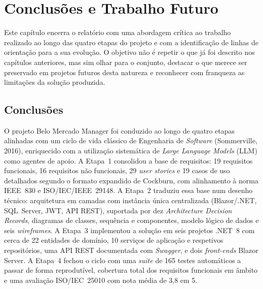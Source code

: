 \chapter{Conclusões e Trabalho Futuro}

    Este capítulo encerra o relatório com uma abordagem crítica ao trabalho realizado ao longo das quatro etapas do projeto e com a identificação de linhas de orientação para a sua evolução. O objetivo não é repetir o que já foi descrito nos capítulos anteriores, mas sim olhar para o conjunto, destacar o que merece ser preservado em projetos futuros desta natureza e reconhecer com franqueza as limitações da solução produzida.

\section{Conclusões}

    O projeto Belo Mercado Manager foi conduzido ao longo de quatro etapas alinhadas com um ciclo de vida clássico de Engenharia de \textit{Software} (Sommerville, 2016), enriquecido com a utilização sistemática de \textit{Large Language Models} (LLM) como agentes de apoio. A Etapa~1 consolidou a base de requisitos: 19 requisitos funcionais, 16 requisitos não funcionais, 29 \textit{user stories} e 19 casos de uso detalhados segundo o formato expandido de Cockburn, com alinhamento à norma IEEE~830 e ISO/IEC/IEEE~29148. A Etapa~2 traduziu essa base num desenho técnico: arquitetura em camadas com instância única centralizada (Blazor/.NET, SQL~Server, JWT, API REST), suportada por dez \textit{Architecture Decision Records}, diagramas de classes, sequência e componentes, modelo lógico de dados e seis \textit{wireframes}. A Etapa~3 implementou a solução em seis projetos .NET~8 com cerca de 22 entidades de domínio, 10 serviços de aplicação e respetivos repositórios, uma API REST documentada com \textit{Swagger}, e dois \textit{front-ends} Blazor Server. A Etapa~4 fechou o ciclo com uma \textit{suite} de 165 testes automáticos a passar de forma reprodutível, cobertura total dos requisitos funcionais em âmbito e uma avaliação ISO/IEC~25010 com nota média de 3,8 em 5.

